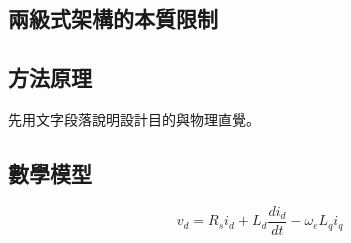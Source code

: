 \documentclass{article}
\begin{document}
\subsection{兩級式架構的本質限制}
%

\subsection{方法原理}   %
先用文字段落說明設計目的與物理直覺。

\subsection{數學模型}   %
\begin{equation}
v_d = R_s i_d + L_d \frac{di_d}{dt} - \omega_e L_q i_q
\end{equation}
\end{document}
